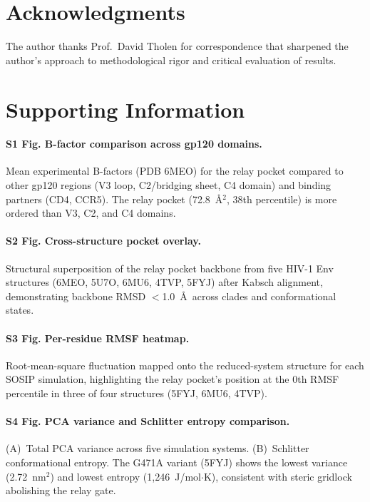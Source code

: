 \documentclass[11pt,a4paper]{article}
\begin{document}
\section*{Acknowledgments}

The author thanks Prof.\ David Tholen for correspondence that sharpened the author's approach to methodological rigor and critical evaluation of results.

\section*{Supporting Information}

\paragraph{S1 Fig. B-factor comparison across gp120 domains.} Mean experimental B-factors (PDB 6MEO) for the relay pocket compared to other gp120 regions (V3 loop, C2/bridging sheet, C4 domain) and binding partners (CD4, CCR5). The relay pocket (72.8~\AA$^2$, 38th percentile) is more ordered than V3, C2, and C4 domains.

\paragraph{S2 Fig. Cross-structure pocket overlay.} Structural superposition of the relay pocket backbone from five HIV-1 Env structures (6MEO, 5U7O, 6MU6, 4TVP, 5FYJ) after Kabsch alignment, demonstrating backbone RMSD $<$1.0~\AA\ across clades and conformational states.

\paragraph{S3 Fig. Per-residue RMSF heatmap.} Root-mean-square fluctuation mapped onto the reduced-system structure for each SOSIP simulation, highlighting the relay pocket's position at the 0th RMSF percentile in three of four structures (5FYJ, 6MU6, 4TVP).

\paragraph{S4 Fig. PCA variance and Schlitter entropy comparison.} (A)~Total PCA variance across five simulation systems. (B)~Schlitter conformational entropy. The G471A variant (5FYJ) shows the lowest variance (2.72~nm$^2$) and lowest entropy (1,246~J/mol$\cdot$K), consistent with steric gridlock abolishing the relay gate.
\end{document}
